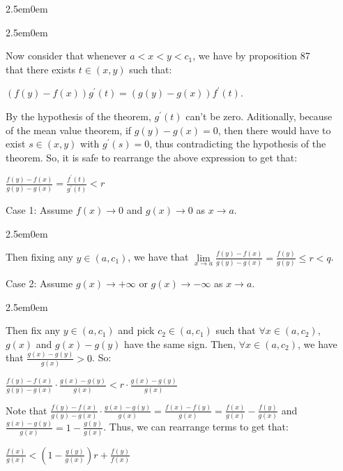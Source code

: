 \documentclass{book}
\newcommand{\hFour}{%
   \color{Cerulean}
   \fontsize{12}{14}\selectfont%
}
\newenvironment{myIndent}{%
   \begin{adjustwidth}{2.5em}{0em}%
}{%
   \end{adjustwidth}%
}
\newcommand{\retTwo}{\hfill\bigbreak}
\begin{document}
{\begin{myIndent}
{\begin{myIndent}
      Now consider that whenever $a < x < y < c_1$, we have by proposition 87\\ that there exists $t \in (x, y)$ such that:

      {\center $ (f(y) - f(x))g^\prime(t) = (g(y) - g(x))f^\prime(t)$.\retTwo\par}

      By the hypothesis of the theorem, $g^\prime(t)$ can't be zero. Aditionally, because\\ of the mean value theorem, if $g(y) - g(x) = 0$, then there would have to\\ exist $s \in (x, y)$ with $g^\prime(s) = 0$, thus contradicting the hypothesis of the\\ theorem. So, it is safe to rearrange the above expression to get that:

      {\center $\frac{f(y) - f(x)}{g(y) - g(x)} = \frac{f^\prime(t)}{g^\prime(t)} < r$ \retTwo\par}

      
      Case 1: Assume $f(x) \rightarrow 0$ and $g(x) \rightarrow 0$ as $x \rightarrow a$.
      {\begin{myIndent}\hFour
         Then fixing any $y \in (a, c_1)$, we have that $\lim\limits_{x\rightarrow a}\frac{f(y) - f(x)}{g(y) - g(x)} = \frac{f(y)}{g(y)} \leq r < q$.\retTwo
      \end{myIndent}}

      Case 2: Assume $g(x) \rightarrow +\infty$ or $g(x) \rightarrow -\infty$ as $x \rightarrow a$.
      {\begin{myIndent}\hFour
         Then fix any $y \in (a, c_1)$ and pick $c_2 \in (a, c_1)$ such that $\forall x \in (a, c_2)$,\\ $g(x)$ and $g(x) - g(y)$ have the same sign. Then, $\forall x \in (a, c_2)$, we have\\ that $\frac{g(x) - g(y)}{g(x)} > 0$. So:

         {\center $ \frac{f(y) - f(x)}{g(y) - g(x)}\cdot\frac{g(x) - g(y)}{g(x)} < r \cdot \frac{g(x) - g(y)}{g(x)} $ \retTwo\par}

        Note that $\frac{f(y) - f(x)}{g(y) - g(x)}\cdot\frac{g(x) - g(y)}{g(x)} = \frac{f(x) - f(y)}{g(x)} = \frac{f(x)}{g(x)} - \frac{f(y)}{g(x)}$ and\\ $\frac{g(x) - g(y)}{g(x)} = 1 - \frac{g(y)}{g(x)}$. Thus, we can rearrange terms to get that:\\ [-8pt]

         {\center $ \frac{f(x)}{g(x)} < \left(1 - \frac{g(y)}{g(x)}\right)r + \frac{f(y)}{f(x)}$ \retTwo\par}


\end{myIndent}}
\end{myIndent}}
\end{myIndent}}
\end{document}
